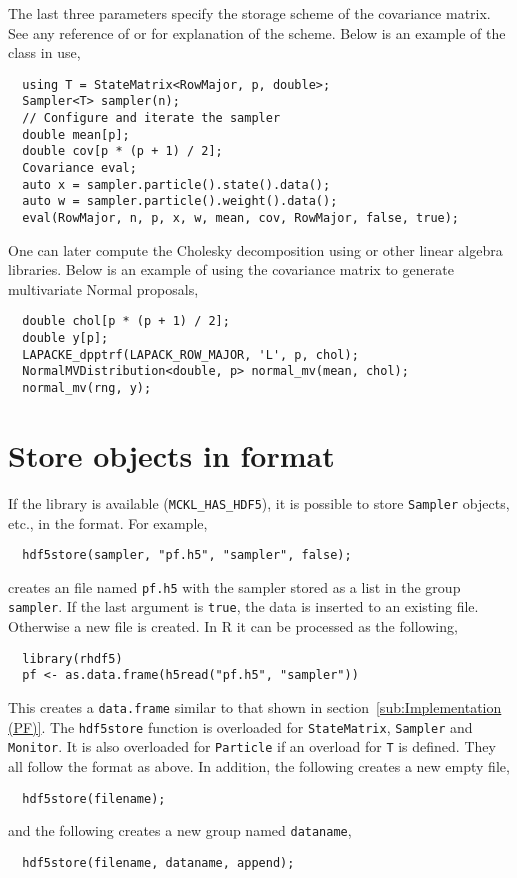 The last three parameters specify the storage scheme of the covariance matrix.
See any reference of \blas or \lapack for explanation of the scheme. Below is
an example of the class in use,
\begin{Verbatim}
  using T = StateMatrix<RowMajor, p, double>;
  Sampler<T> sampler(n);
  // Configure and iterate the sampler
  double mean[p];
  double cov[p * (p + 1) / 2];
  Covariance eval;
  auto x = sampler.particle().state().data();
  auto w = sampler.particle().weight().data();
  eval(RowMajor, n, p, x, w, mean, cov, RowMajor, false, true);
\end{Verbatim}
One can later compute the Cholesky decomposition using \lapack or other linear
algebra libraries. Below is an example of using the covariance matrix to
generate multivariate Normal proposals,
\begin{Verbatim}
  double chol[p * (p + 1) / 2];
  double y[p];
  LAPACKE_dpptrf(LAPACK_ROW_MAJOR, 'L', p, chol);
  NormalMVDistribution<double, p> normal_mv(mean, chol);
  normal_mv(rng, y);
\end{Verbatim}

\section{Store objects in \texorpdfstring{\protect{}}{HDF5} format}
\label{sec:Store objects in HDF5 format}

If the \hdf library is available (\verb|MCKL_HAS_HDF5|), it is possible to
store \verb|Sampler| objects, etc., in the \hdf format. For example,
\begin{Verbatim}
  hdf5store(sampler, "pf.h5", "sampler", false);
\end{Verbatim}
creates an \hdf file named \verb|pf.h5| with the sampler stored as a list in
the group \verb|sampler|. If the last argument is \verb|true|, the data is
inserted to an existing file. Otherwise a new file is created. In R it can be
processed as the following,
\begin{Verbatim}
  library(rhdf5)
  pf <- as.data.frame(h5read("pf.h5", "sampler"))
\end{Verbatim}
This creates a \verb|data.frame| similar to that shown in
section~\ref{sub:Implementation (PF)}. The \verb|hdf5store| function is
overloaded for \verb|StateMatrix|, \verb|Sampler| and \verb|Monitor|. It is
also overloaded for \verb|Particle| if an overload for \verb|T| is defined.
They all follow the format as above. In addition, the following creates a new
empty \hdf file,
\begin{Verbatim}
  hdf5store(filename);
\end{Verbatim}
and the following creates a new group named \verb|dataname|,
\begin{Verbatim}
  hdf5store(filename, dataname, append);
\end{Verbatim}

